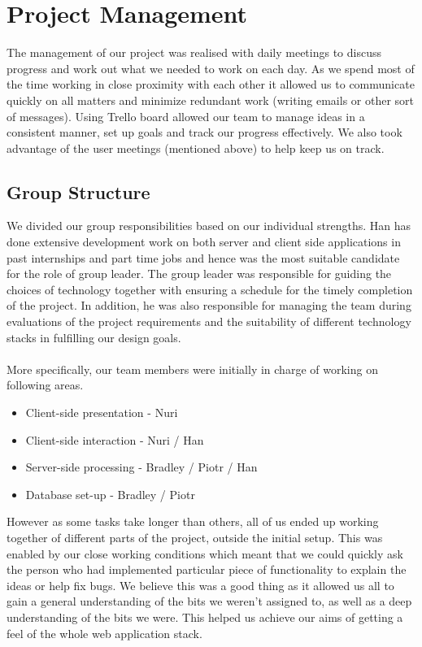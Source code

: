 \documentclass[10pt,a4paper]{article}
\begin{document}
\section{Project Management}

\noindent The management of our project was realised with daily meetings to 
discuss progress and work out what we needed to work on each day. As we spend 
most of the time working in close proximity with each other it allowed us to 
communicate quickly on all matters and minimize redundant work (writing emails
or other sort of messages). Using Trello board allowed our team to manage
ideas in a consistent manner, set up goals and track our progress effectively. 
We also took advantage of the user meetings (mentioned above) to help keep us on track. 

\subsection{Group Structure}
\noindent We divided our group responsibilities based on our individual 
strengths. Han has done extensive development work on both server and client 
side applications in past internships and part time jobs and hence was the most 
suitable candidate for the role of group leader. The group leader was responsible 
for guiding the choices of technology together with ensuring a schedule for the 
timely completion of the project. In addition, he was also responsible for 
managing the team during evaluations of the project requirements and the 
suitability of different technology stacks in fulfilling our design goals.
\\
\\
\noindent
More specifically, our team members were initially in charge of working on 
following areas.

\begin{itemize}
  \item Client-side presentation - Nuri
  \item Client-side interaction - Nuri / Han
  \item Server-side processing - Bradley / Piotr / Han
  \item Database set-up - Bradley / Piotr
\end{itemize}

\noindent However as some tasks take longer than others, all of us ended up 
working together of different parts of the project, outside the initial setup.
This was enabled by our close working conditions which meant that we could quickly ask 
the person who had implemented particular piece of functionality to explain the ideas 
or help fix bugs. We believe this was a good thing as it allowed us all to gain a general 
understanding of the bits we weren't assigned to, as well as a deep 
understanding of the bits we were. This helped us achieve our aims of getting a 
feel of the whole web application stack.   
\end{document}
